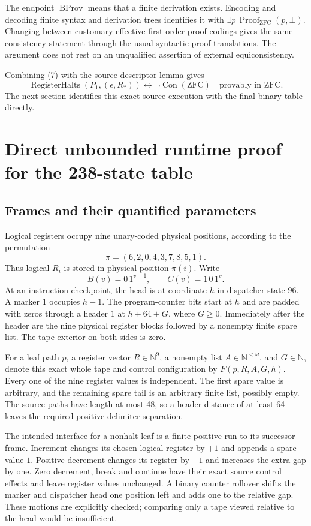 \documentclass[11pt]{article}
\theoremstyle{definition}\newtheorem{definition}[theorem]{Definition}
\newcommand{\Con}{\operatorname{Con}}
\newcommand{\RHalt}{\operatorname{RegisterHalts}}
\newcommand{\ZFC}{\mathrm{ZFC}}
\begin{document}
The endpoint $\operatorname{BProv}$ means that a finite derivation exists.
Encoding and decoding finite syntax and derivation trees identifies it
with $\exists p\,\operatorname{Proof}_{\ZFC}(p,\bot)$.  Changing between
customary effective first-order proof codings gives the same consistency
statement through the usual syntactic proof translations.  The argument
does not rest on an unqualified assertion of external equiconsistency.

Combining (7) with the source descriptor lemma gives
\[
 \RHalt(P_1,(\epsilon,R_*))
 \longleftrightarrow\neg\Con(\ZFC)
 \quad\text{provably in ZFC.}
 \tag{8}
\]
The next section identifies this exact source execution with the final
binary table directly.

\section{Direct unbounded runtime proof for the 238-state table}
\label{sec:runtime}

\subsection{Frames and their quantified parameters}

Logical registers occupy nine unary-coded physical positions, according to
the permutation
\[
 \pi=(6,2,0,4,3,7,8,5,1).
\]
Thus logical $R_i$ is stored in physical position $\pi(i)$.
Write
\[
 B(v)=0\,1^{v+1},\qquad C(v)=1\,0\,1^v.
\]
At an instruction checkpoint, the head is at coordinate $h$ in dispatcher
state $96$.  A marker $1$ occupies $h-1$.  The program-counter bits start at
$h$ and are padded with zeros through a header $1$ at $h+64+G$, where
$G\ge0$.  Immediately after the header are the nine physical register
blocks followed by a nonempty finite spare list.  The tape exterior on
both sides is zero.

For a leaf path $p$, a register vector $R\in\mathbb N^9$, a nonempty list
$A\in\mathbb N^{<\omega}$, and $G\in\mathbb N$, denote this exact whole
tape and control configuration by $F(p,R,A,G,h)$.  Every one of the nine
register values is independent.  The first spare value is arbitrary, and
the remaining spare tail is an arbitrary finite list, possibly empty.
The source paths have length at most 48, so a header distance of at least
64 leaves the required positive delimiter separation.

The intended interface for a nonhalt leaf is a finite positive run to its
successor frame.  Increment changes its chosen logical register by $+1$
and appends a spare value $1$.  Positive decrement changes its register by
$-1$ and increases the extra gap by one.  Zero decrement, break and
continue have their exact source control effects and leave register values
unchanged.  A binary counter rollover shifts the marker and dispatcher
head one position left and adds one to the relative gap.  These motions
are explicitly checked; comparing only a tape viewed relative to the head
would be insufficient.
\end{document}
